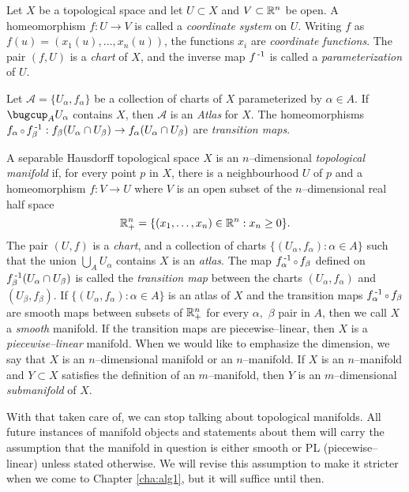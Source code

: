 

\begin{defn}[Coordinates]
	\label{def:coordinates}
	Let $X$ be a topological space and let $U\subset X$ and $V\subset \mathbb{R}^n$ be open.
	A homeomorphism $f:U\to V$ is called a \emph{coordinate system} on $U$.
	Writing $f$ as $f(u)=(x_1(u),\dots,x_n(u))$, the functions $x_i$ are \emph{coordinate functions}.
	The pair $(f,U)$ is a \emph{chart} of $X$, and the inverse map $f^{\,\text{-}1}$ is called a \emph{parameterization} of $U$.
\end{defn}

\begin{defn}[Atlas]
	\label{def:atlas}
	Let $\mathcal{A}=\{U_\alpha,f_\alpha\}$ be a collection of charts of $X$ parameterized by $\alpha\in A$.
	If $\bugcup_A U_\alpha$ contains $X$, then $\mathcal{A}$ is an \emph{Atlas} for $X$.
	The homeomorphisms $f_\alpha\comp f_\beta\inv:f_\beta(U_\alpha\cap U_\beta)\to f_\alpha(U_\alpha\cap U_\beta)$ are \emph{transition maps}.
	
\end{defn}


\begin{defn}[Manifolds]
	\label{def:manifold}
	A separable Hausdorff topological space $X$ is an $n$--dimensional \emph{topological manifold} if, for every point $p$ in $X$, there is a neighbourhood $U$ of $p$ and a homeomorphism $f:V\to U$ where $V$ is an open subset of the $n$--dimensional real half space $$\mathbb{R}_+^n=\{(x_1,\dots,x_{n})\in\mathbb{R}^n : x_n\geq 0\}.$$
	The pair $(U,f)$ is a \emph{chart}, and a collection of charts $\{(U_\alpha,f_\alpha):\alpha\in A\}$ such that the union $\bigcup_A U_\alpha$ contains $X$ is an \emph{atlas}.
	The map $f_\alpha\inv\comp f_\beta$ defined on $f_\beta^{\,\text{-}1}(U_\alpha\cap U_\beta)$ is called the \emph{transition map} between the charts $(U_\alpha,f_\alpha)$ and $(U_\beta,f_\beta)$.
	If $\{(U_\alpha,f_\alpha):\alpha\in A\}$ is an atlas of $X$ and the transition maps $f_\alpha\inv\comp f_\beta$ are smooth maps between subsets of $\mathbb{R}_+^n$ for every $\alpha,$ $\beta$ pair in $A$, then we call $X$ a \emph{smooth} manifold.
	If the transition maps are piecewise--linear, then $X$ is a \emph{piecewise--linear} manifold.
	When we would like to emphasize the dimension, we say that $X$ is an $n$--dimensional manifold or an $n$--manifold.
	If $X$ is an $n$--manifold and $Y\subset X$ satisfies the definition of an $m$--manifold, then $Y$ is an $m$--dimensional \emph{submanifold} of $X$.
\end{defn}

With that taken care of, we can stop talking about topological manifolds.
All future instances of manifold objects and statements about them will carry the assumption that the manifold in question is either smooth or PL (piecewise--linear) unless stated otherwise.
We will revise this assumption to make it stricter when we come to Chapter \ref{cha:alg1}, but it will suffice until then.

